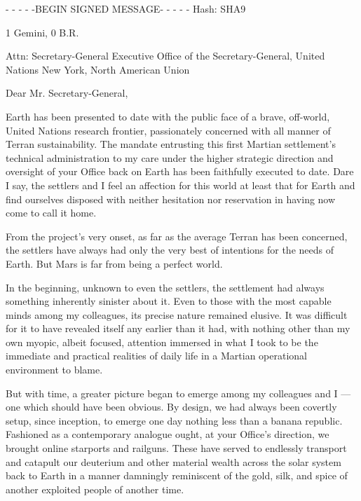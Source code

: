 
\startlines
- - - - -BEGIN SIGNED MESSAGE- - - - -
Hash: SHA9

1 Gemini, 0 B.R.

Attn: Secretary-General
Executive Office of the Secretary-General, United Nations
New York, North American Union
\blank

Dear Mr. Secretary-General,

Earth has been presented to date with the public face of a brave, off-world, United Nations research frontier, passionately concerned with all manner of Terran sustainability. The mandate entrusting this first Martian settlement's technical administration to my care under the higher strategic direction and oversight of your Office back on Earth has been faithfully executed to date. Dare I say, the settlers and I feel an affection for this world at least that for Earth and find ourselves disposed with neither hesitation nor reservation in having now come to call it home.

From the project's very onset, as far as the average Terran has been concerned, the settlers have always had only the very best of intentions for the needs of Earth. But Mars is far from being a perfect world. 

In the beginning, unknown to even the settlers, the settlement had always something inherently sinister about it. Even to those with the most capable minds among my colleagues, its precise nature remained elusive. It was difficult for it to have revealed itself any earlier than it had, with nothing other than my own myopic, albeit focused, attention immersed in what I took to be the immediate and practical realities of daily life in a Martian operational environment to blame.

But with time, a greater picture began to emerge among my colleagues and I — one which should have been obvious. By design, we had always been covertly setup, since inception, to emerge one day nothing less than a banana republic. Fashioned as a contemporary analogue ought, at your Office's direction, we brought online starports and railguns. These have served to endlessly transport and catapult our deuterium and other material wealth across the solar system back to Earth in a manner damningly reminiscent of the gold, silk, and spice of another exploited people of another time.

